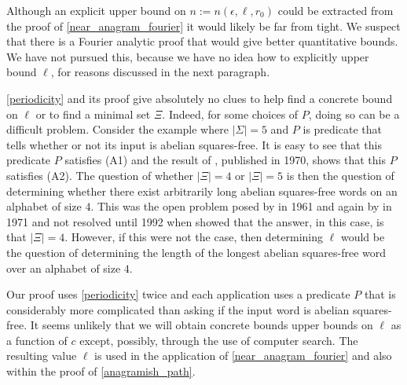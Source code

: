 \documentclass{patmorin}
\begin{document}
Although an explicit upper bound on $n:=n(\epsilon,\ell,r_0)$ could be extracted from the proof of \cref{near_anagram_fourier} it would likely be far from tight.  We suspect that there is a Fourier analytic proof that would give better quantitative bounds.  We have not pursued this, because we have no idea how to explicitly upper bound $\ell$, for reasons discussed in the next paragraph.

\cref{periodicity} and its proof give absolutely no clues to help find a concrete bound on $\ell$ or to find a minimal set $\Xi$. Indeed, for some choices of $P$, doing so can be a difficult problem.  Consider the example where $|\Sigma|=5$ and $P$ is predicate that tells whether or not its input is abelian squares-free. It is easy to see that this predicate $P$ satisfies (A1) and the result of \citet{pleasants:non-repetitive}, published in 1970, shows that this $P$ satisfies (A2).  The question of whether $|\Xi|=4$ or $|\Xi|=5$ is then the question of determining whether there exist arbitrarily long abelian squares-free words on an alphabet of size $4$.  This was the open problem posed by \citet{erdos:some} in 1961 and again by \citet{brown:is} in 1971 and not resolved until 1992 when \citet{keranen:abelian,keranen:powerful} showed that the answer, in this case, is that $|\Xi|=4$.  However, if this were not the case, then determining $\ell$ would be the question of determining the length of the longest abelian squares-free word over an alphabet of size $4$.

Our proof uses \cref{periodicity} twice and each application uses a predicate $P$ that is considerably more complicated than asking if the input word is abelian squares-free. It seems unlikely that we will obtain concrete bounds upper bounds on $\ell$ as a function of $c$ except, possibly, through the use of computer search. The resulting value $\ell$ is used in the application of \cref{near_anagram_fourier} and also within the proof of \cref{anagramish_path}.





\end{document}
